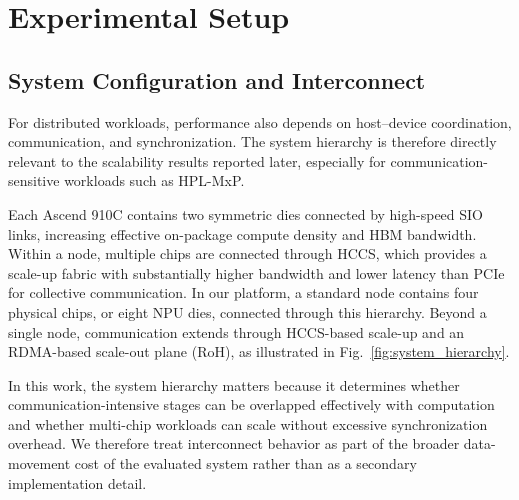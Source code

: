 \documentclass{article}
\begin{document}

\section{Experimental Setup}

\subsection{System Configuration and Interconnect}

For distributed workloads, performance also depends on host--device coordination, communication, and synchronization. The system hierarchy is therefore directly relevant to the scalability results reported later, especially for communication-sensitive workloads such as HPL-MxP.

Each Ascend 910C contains two symmetric dies connected by high-speed SIO links, increasing effective on-package compute density and HBM bandwidth. Within a node, multiple chips are connected through HCCS, which provides a scale-up fabric with substantially higher bandwidth and lower latency than PCIe for collective communication. In our platform, a standard node contains four physical chips, or eight NPU dies, connected through this hierarchy. Beyond a single node, communication extends through HCCS-based scale-up and an RDMA-based scale-out plane (RoH), as illustrated in Fig.~\ref{fig:system_hierarchy}.

In this work, the system hierarchy matters because it determines whether communication-intensive stages can be overlapped effectively with computation and whether multi-chip workloads can scale without excessive synchronization overhead. We therefore treat interconnect behavior as part of the broader data-movement cost of the evaluated system rather than as a secondary implementation detail.
\end{document}
